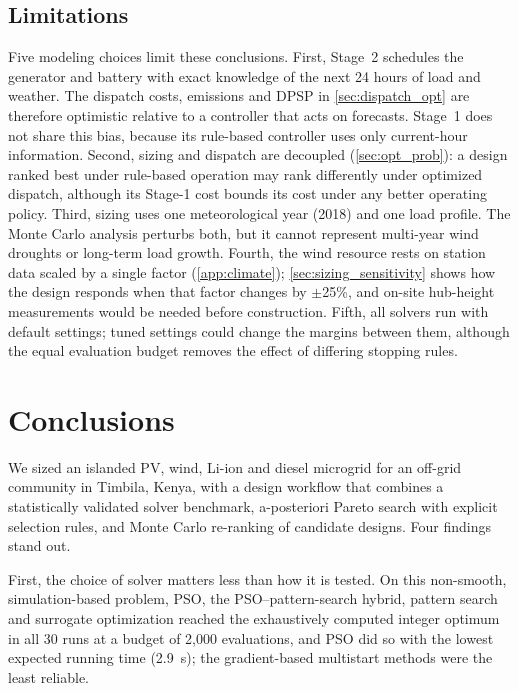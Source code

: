 \documentclass[final,3p,times]{elsarticle}
\begin{document}
\subsection{Limitations\label{sec:limitations}}
Five modeling choices limit these conclusions. First, Stage~2 schedules the generator and battery with exact knowledge of the next 24 hours of load and weather. The dispatch costs, emissions and DPSP in \cref{sec:dispatch_opt} are therefore optimistic relative to a controller that acts on forecasts. Stage~1 does not share this bias, because its rule-based controller uses only current-hour information. Second, sizing and dispatch are decoupled (\cref{sec:opt_prob}): a design ranked best under rule-based operation may rank differently under optimized dispatch, although its Stage-1 cost bounds its cost under any better operating policy. Third, sizing uses one meteorological year (2018) and one load profile. The Monte Carlo analysis perturbs both, but it cannot represent multi-year wind droughts or long-term load growth. Fourth, the wind resource rests on station data scaled by a single factor (\cref{app:climate}); \cref{sec:sizing_sensitivity} shows how the design responds when that factor changes by $\pm$25\%, and on-site hub-height measurements would be needed before construction. Fifth, all solvers run with default settings; tuned settings could change the margins between them, although the equal evaluation budget removes the effect of differing stopping rules.

\section{Conclusions}

We sized an islanded PV, wind, Li-ion and diesel microgrid for an off-grid community in Timbila, Kenya, with a design workflow that combines a statistically validated solver benchmark, a-posteriori Pareto search with explicit selection rules, and Monte Carlo re-ranking of candidate designs. Four findings stand out.

First, the choice of solver matters less than how it is tested. On this non-smooth, simulation-based problem, PSO, the PSO--pattern-search hybrid, pattern search and surrogate optimization reached the exhaustively computed integer optimum in all 30 runs at a budget of 2,000 evaluations, and PSO did so with the lowest expected running time (2.9~s); the gradient-based multistart methods were the least reliable.
\end{document}
